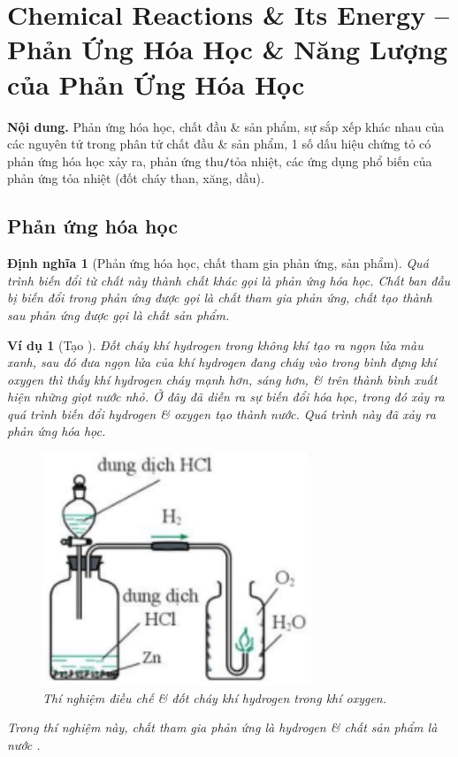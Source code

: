 \documentclass{article}
\newtheorem{dinhnghia}{Định nghĩa}
\newtheorem{vidu}{Ví dụ}
\begin{document}
\noindent{}


\section{Chemical Reactions \& Its Energy -- Phản Ứng Hóa Học \& Năng Lượng của Phản Ứng Hóa Học}
\textsf{\textbf{Nội dung.} Phản ứng hóa học, chất đầu \& sản phẩm, sự sắp xếp khác nhau của các nguyên tử trong phân tử chất đầu \& sản phẩm, 1 số dấu hiệu chứng tỏ có phản ứng hóa học xảy ra, phản ứng thu\texttt{/}tỏa nhiệt, các ứng dụng phổ biến của phản ứng tỏa nhiệt (đốt cháy than, xăng, dầu).}

\subsection{Phản ứng hóa học}

\begin{dinhnghia}[Phản ứng hóa học, chất tham gia phản ứng, sản phẩm]
	Quá trình biến đổi từ chất này thành chất khác gọi là \emph{phản ứng hóa học}. Chất ban đầu bị biến đổi trong phản ứng được gọi là \emph{chất tham gia phản ứng}, chất tạo thành sau phản ứng được gọi là \emph{chất sản phẩm}.
\end{dinhnghia}

\begin{vidu}[Tạo ]
	Đốt cháy khí hydrogen trong không khí tạo ra ngọn lửa màu xanh, sau đó đưa ngọn lửa của khí hydrogen đang cháy vào trong bình đựng khí oxygen thì thấy khí hydrogen cháy mạnh hơn, sáng hơn, \& trên thành bình xuất hiện những giọt nước nhỏ. Ở đây đã diễn ra sự biến đổi hóa học, trong đó xảy ra quá trình biến đổi hydrogen \& oxygen tạo thành nước. Quá trình này đã xảy ra phản ứng hóa học.
	\begin{figure}[H]
		\centering
		\includegraphics[scale=0.3]{H2O}
		\caption{Thí nghiệm điều chế \& đốt cháy khí hydrogen trong khí oxygen.}
		\label{fig: H2O}
	\end{figure}
	Trong thí nghiệm này, chất tham gia phản ứng là hydrogen \emph{} \& chất sản phẩm là nước \emph{}.
\end{vidu}
\end{document}
